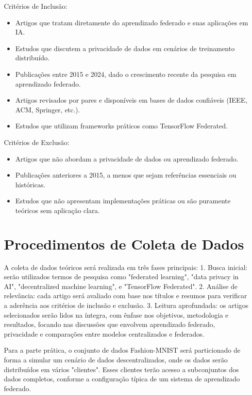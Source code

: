 Critérios de Inclusão:
\begin{itemize}
    \item Artigos que tratam diretamente do aprendizado federado e suas aplicações em IA.
    \item Estudos que discutem a privacidade de dados em cenários de treinamento distribuído.
    \item Publicações entre 2015 e 2024, dado o crescimento recente da pesquisa em aprendizado federado.
    \item Artigos revisados por pares e disponíveis em bases de dados confiáveis (IEEE, ACM, Springer, etc.).
    \item Estudos que utilizam frameworks práticos como TensorFlow Federated.
\end{itemize}

Critérios de Exclusão:
\begin{itemize}
    \item Artigos que não abordam a privacidade de dados ou aprendizado federado.
    \item Publicações anteriores a 2015, a menos que sejam referências essenciais ou históricas.
    \item Estudos que não apresentam implementações práticas ou são puramente teóricos sem aplicação clara.
\end{itemize}

\section{Procedimentos de Coleta de Dados}

A coleta de dados teóricos será realizada em três fases principais:
1. Busca inicial: serão utilizados termos de pesquisa como "federated learning", "data privacy in AI", "decentralized machine learning", e "TensorFlow Federated".
2. Análise de relevância: cada artigo será avaliado com base nos títulos e resumos para verificar a aderência aos critérios de inclusão e exclusão.
3. Leitura aprofundada: os artigos selecionados serão lidos na íntegra, com ênfase nos objetivos, metodologia e resultados, focando nas discussões que envolvem aprendizado federado, privacidade e comparações entre modelos centralizados e federados.

Para a parte prática, o conjunto de dados Fashion-MNIST será particionado de forma a simular um cenário de dados descentralizados, onde os dados serão distribuídos em vários "clientes". Esses clientes terão acesso a subconjuntos dos dados completos, conforme a configuração típica de um sistema de aprendizado federado.

